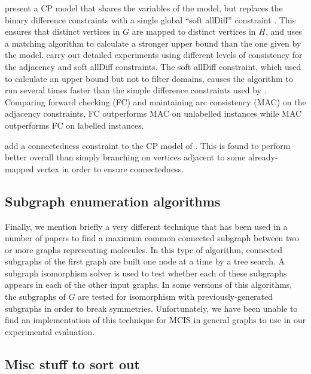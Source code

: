 \citet{DBLP:conf/cp/NdiayeS11} present a CP model that shares the variables
of the \citeauthor{DBLP:conf/mco/VismaraV08} model, but replaces the binary difference
constraints with a single global ``soft allDiff''
constraint \citep{DBLP:conf/cp/PetitRB01}.  This ensures that distinct vertices
in $G$ are mapped to distinct vertices in $H$, and uses a matching algorithm
to calculate a stronger upper bound than the one given by
the \citeauthor{DBLP:conf/mco/VismaraV08} model.
\citeauthor{DBLP:conf/cp/NdiayeS11} carry out detailed experiments using
different levels of consistency for the adjacency and soft allDiff constraints.
The soft allDiff constraint, which used to calculate an upper bound but
not to filter domains, causes the algorithm to run several times faster
than the simple difference constraints used by \citeauthor{DBLP:conf/mco/VismaraV08}.
Comparing forward checking (FC) and maintaining arc consistency (MAC)
on the adjacency constraints, FC outperforms MAC on unlabelled instances
while MAC outperforms FC on labelled instances.

\cite{DBLP:conf/cp/McCreeshNPS16} add a connectedness constraint to
the CP model of \citet{DBLP:conf/cp/NdiayeS11}.  This is found to perform
better overall than simply branching on vertices adjacent to some already-mapped
vertex in order to ensure connectedness.

\subsection{Subgraph enumeration algorithms}

Finally, we mention briefly a very different technique that has been used
in a number of papers to find a maximum common connected subgraph between two or more
graphs representing molecules.
\citep{armitage1967automatic}
\citep{takahashi1987recognition}
\citep{DBLP:journals/jcheminf/DalkeH13}
In this type of algorithm, connected
subgraphs of the first graph are built one node at a time by a tree search.
A subgraph isomorphism solver is used to test whether each of these subgraphs
appears in each of the other input graphs.  In some versions of this algorithms,
the subgraphs of $G$ are tested for isomorphism with previously-generated subgraphs
in order to break symmetries.
Unfortunately, we have been unable to find an implementation of this technique
for MCIS in general graphs to use in our experimental evaluation.

\subsection{Misc stuff to sort out}

